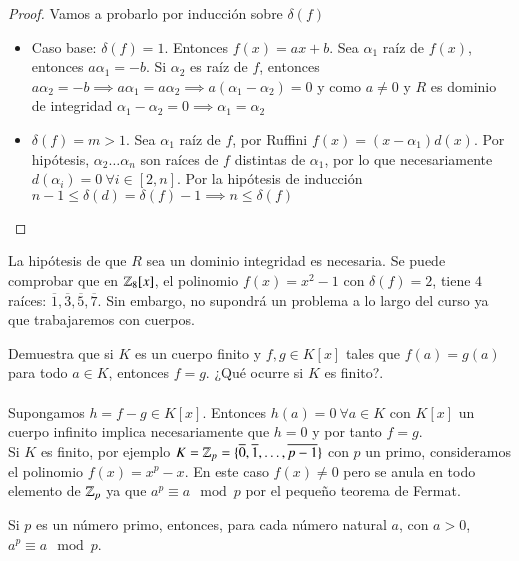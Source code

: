 \begin{proof}
    Vamos a probarlo por inducción sobre $\delta(f)$
    \begin{itemize}
        \item Caso base: $\delta(f) = 1$. Entonces $f(x) = ax + b$. Sea $\alpha_1$ raíz de $f(x)$, entonces $a \alpha_1 = - b$. Si $\alpha_2$ es raíz de $f$, entonces $a \alpha_2 = -b \implies a \alpha_1 = a \alpha_2 \implies a (\alpha_1 - \alpha_2) = 0$ y como $a \neq 0$ y $R$ es dominio de integridad $\alpha_1 - \alpha_2 = 0 \implies \alpha_1 = \alpha_2$

        \item $\delta(f) = m > 1$. Sea $\alpha_1$ raíz de $f$, por Ruffini $f(x) = (x - \alpha_1) d(x)$. Por hipótesis, $\alpha_2 \ldots \alpha_n$ son raíces de $f$ distintas de $\alpha_1$, por lo que necesariamente $d(\alpha_i) = 0\ \forall i \in [2, n]$. Por la hipótesis de inducción $n - 1 \leq \delta(d) = \delta(f) - 1 \implies n \leq \delta(f)$
    \end{itemize}
\end{proof}

\begin{obs}
    La hipótesis de que $R$ sea un dominio integridad es necesaria. Se puede comprobar que en $\mathbb{Z}_8[x]$, el polinomio $f(x) = x^2 - 1$ con $\delta(f) = 2$, tiene $4$ raíces: $\overline 1, \overline 3, \overline 5, \overline 7$. Sin embargo, no supondrá un problema a lo largo del curso ya que trabajaremos con cuerpos.
\end{obs}

\begin{ex}[H1.27]
    Demuestra que si $K$ es un cuerpo finito y $f, g \in K[x]$ tales que $f(a) = g(a)$ para todo $a \in K$, entonces $f = g$. ¿Qué ocurre si $K$ es finito?.\\\\

    Supongamos $h = f - g \in K[x]$. Entonces $ h(a) = 0\ \forall a \in K$ con $K[x]$ un cuerpo infinito implica necesariamente que $h = 0$ y por tanto $f = g$.\\
    Si $K$ es finito, por ejemplo $K = \mathbb{Z}_p = \{\overline 0, \overline 1, \ldots, \overline{p-1}\}$ con $p$ un primo, consideramos el polinomio $f(x) = x^p - x$. En este caso $f(x) \neq 0$ pero se anula en todo elemento de $\mathbb{Z}_p$ ya que $a^p \equiv a \mod p$ por el pequeño teorema de Fermat.
\end{ex}

\begin{thm}
    Si $p$ es un número primo, entonces, para cada número natural $a$, con $a > 0$, $a^p \equiv a \mod p$.
\end{thm}

